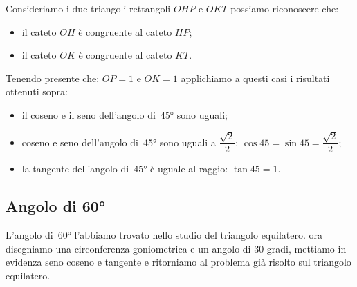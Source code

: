  \begin{minipage}{.45\textwidth}
  \begin{center}
\begin{inaccessibleblock}
\angoloquarantacinque
% 
\end{inaccessibleblock}
  \end{center}
 \end{minipage}
 \begin{minipage}{.45\textwidth}
Consideriamo i due triangoli rettangoli \(OHP\) e \(OKT\) possiamo riconoscere 
che:
\begin{itemize} [noitemsep]
 \item il cateto \(OH\) è congruente al cateto \(HP\); 
 \item il cateto \(OK\) è congruente al cateto \(KT\).\\
\end{itemize}
 \end{minipage}
 
Tenendo presente che: \(OP=1\) e \(OK=1\) applichiamo a questi casi i risultati 
ottenuti sopra:
\begin{itemize} [noitemsep]
 \item il coseno e il seno dell'angolo di~45° sono uguali;
 \item coseno e seno dell'angolo di~45° sono uguali a 
 \(\dfrac{\sqrt{2}}{2}\): 
  \(\cos 45 = \sin 45 = \dfrac{\sqrt{2}}{2}\); 
 \item la tangente dell'angolo di~45° è uguale al raggio: 
  \(\tan 45 = 1\).
\end{itemize}

\subsection{Angolo di 60°}

L'angolo di~60° l'abbiamo trovato nello studio del triangolo equilatero. ora 
disegniamo una circonferenza goniometrica e un angolo di 30 gradi, mettiamo 
in 
evidenza seno coseno e tangente e ritorniamo al problema già risolto sul 
triangolo equilatero.\\

